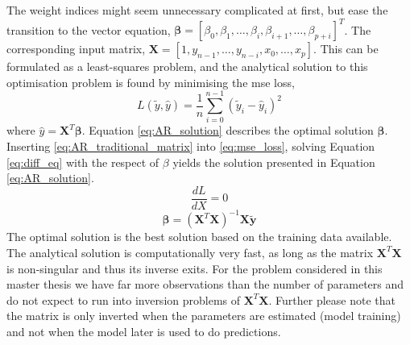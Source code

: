 The weight indices might seem unnecessary complicated at first, but ease the transition to the vector equation, $\mathbf{\beta} = [\beta_0, \beta_1, \ldots, \beta_i, \beta_{i+1}, \ldots, \beta_{p+i}]^T$. The corresponding input matrix, $\mathbf{X} = [1, y_{n-1}, \ldots, y_{n-i}, x_0, \ldots, x_p]$. 
This can be formulated as a least-squares problem, and the analytical solution to this optimisation problem is found by minimising the \acrfull{mse} loss, 
\begin{equation} \label{eq:mse_loss}
    L (\tilde{y}, \hat{y}) = \frac{1}{n} \sum_{i=0}^{n-1}(\tilde{y}_i-\hat{y}_i)^2
\end{equation} 
where $\hat{y} = \mathbf{X}^T \mathbf{\beta}$. Equation \eqref{eq:AR_solution} describes the optimal solution $\mathbf{\beta}$. Inserting \eqref{eq:AR_traditional_matrix} into \eqref{eq:mse_loss}, solving Equation \eqref{eq:diff_eq} with the respect of $\beta$ yields the solution presented in Equation \eqref{eq:AR_solution}.  
\begin{equation} \label{eq:diff_eq}
    \frac{dL}{dX} = 0
\end{equation}
\begin{equation} \label{eq:AR_solution}
    \mathbf{\beta}  = \left( \mathbf{X}^T\mathbf{X}\right)^{-1} \mathbf{X}\tilde{\mathbf{y}}
\end{equation}
The optimal solution is the best solution based on the training data available. The analytical solution is computationally very fast, as long as the matrix $\mathbf{X}^T\mathbf{X}$ is non-singular and thus its inverse exits. For the problem considered in this master thesis we have far more observations than the number of parameters and do not expect to run into inversion problems of $\mathbf{X}^T\mathbf{X}$. Further please note that the matrix is only inverted when the parameters are estimated (model training) and not when the model later is used to do predictions.



